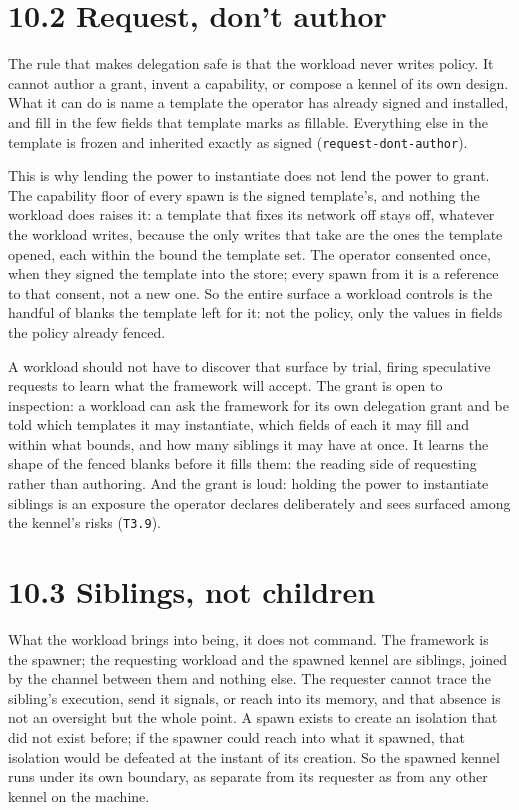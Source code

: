 \hypertarget{request-dont-author}{%
\section{10.2 Request, don't author}\label{request-dont-author}}

The rule that makes delegation safe is that the workload never writes
policy. It cannot author a grant, invent a capability, or compose a
kennel of its own design. What it can do is name a template the operator
has already signed and installed, and fill in the few fields that
template marks as fillable. Everything else in the template is frozen
and inherited exactly as signed (\texttt{request-dont-author}).

This is why lending the power to instantiate does not lend the power to
grant. The capability floor of every spawn is the signed template's, and
nothing the workload does raises it: a template that fixes its network
off stays off, whatever the workload writes, because the only writes
that take are the ones the template opened, each within the bound the
template set. The operator consented once, when they signed the template
into the store; every spawn from it is a reference to that consent, not
a new one. So the entire surface a workload controls is the handful of
blanks the template left for it: not the policy, only the values in
fields the policy already fenced.

A workload should not have to discover that surface by trial, firing
speculative requests to learn what the framework will accept. The grant
is open to inspection: a workload can ask the framework for its own
delegation grant and be told which templates it may instantiate, which
fields of each it may fill and within what bounds, and how many siblings
it may have at once. It learns the shape of the fenced blanks before it
fills them: the reading side of requesting rather than authoring. And
the grant is loud: holding the power to instantiate siblings is an
exposure the operator declares deliberately and sees surfaced among the
kennel's risks (\texttt{T3.9}).

\hypertarget{siblings-not-children}{%
\section{10.3 Siblings, not children}\label{siblings-not-children}}

What the workload brings into being, it does not command. The framework
is the spawner; the requesting workload and the spawned kennel are
siblings, joined by the channel between them and nothing else. The
requester cannot trace the sibling's execution, send it signals, or
reach into its memory, and that absence is not an oversight but the
whole point. A spawn exists to create an isolation that did not exist
before; if the spawner could reach into what it spawned, that isolation
would be defeated at the instant of its creation. So the spawned kennel
runs under its own boundary, as separate from its requester as from any
other kennel on the machine.

